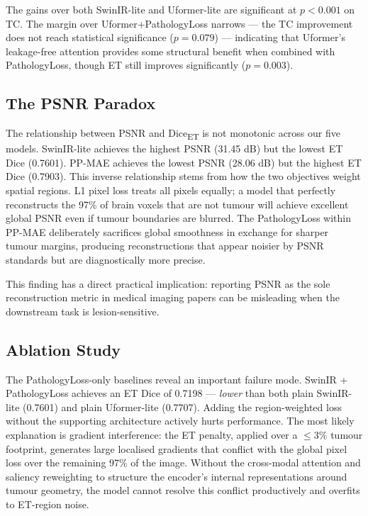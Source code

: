 \documentclass[conference]{IEEEtran}
\begin{document}
The gains over both SwinIR-lite and Uformer-lite are significant at
$p < 0.001$ on TC. The margin over Uformer+PathologyLoss narrows —
the TC improvement does not reach statistical significance
($p = 0.079$) — indicating that Uformer's leakage-free attention
provides some structural benefit when combined with PathologyLoss,
though ET still improves significantly ($p = 0.003$).

\subsection{The PSNR Paradox}

The relationship between PSNR and Dice\textsubscript{ET} is not
monotonic across our five models. SwinIR-lite achieves the highest
PSNR (31.45 dB) but the lowest ET Dice (0.7601). PP-MAE achieves
the lowest PSNR (28.06 dB) but the highest ET Dice (0.7903). This
inverse relationship stems from how the two objectives weight spatial
regions. L1 pixel loss treats all pixels equally; a model that
perfectly reconstructs the 97\% of brain voxels that are not tumour
will achieve excellent global PSNR even if tumour boundaries are
blurred. The PathologyLoss within PP-MAE deliberately sacrifices
global smoothness in exchange for sharper tumour margins, producing
reconstructions that appear noisier by PSNR standards but are
diagnostically more precise.

This finding has a direct practical implication: reporting PSNR as
the sole reconstruction metric in medical imaging papers can be
misleading when the downstream task is lesion-sensitive.

\subsection{Ablation Study}

The PathologyLoss-only baselines reveal an important failure mode.
SwinIR + PathologyLoss achieves an ET Dice of 0.7198 — \emph{lower}
than both plain SwinIR-lite (0.7601) and plain Uformer-lite (0.7707).
Adding the region-weighted loss without the supporting architecture
actively hurts performance. The most likely explanation is gradient
interference: the ET penalty, applied over a $\leq 3\%$ tumour
footprint, generates large localised gradients that conflict with the
global pixel loss over the remaining 97\% of the image. Without the
cross-modal attention and saliency reweighting to structure the
encoder's internal representations around tumour geometry, the model
cannot resolve this conflict productively and overfits to ET-region
noise.
\end{document}
